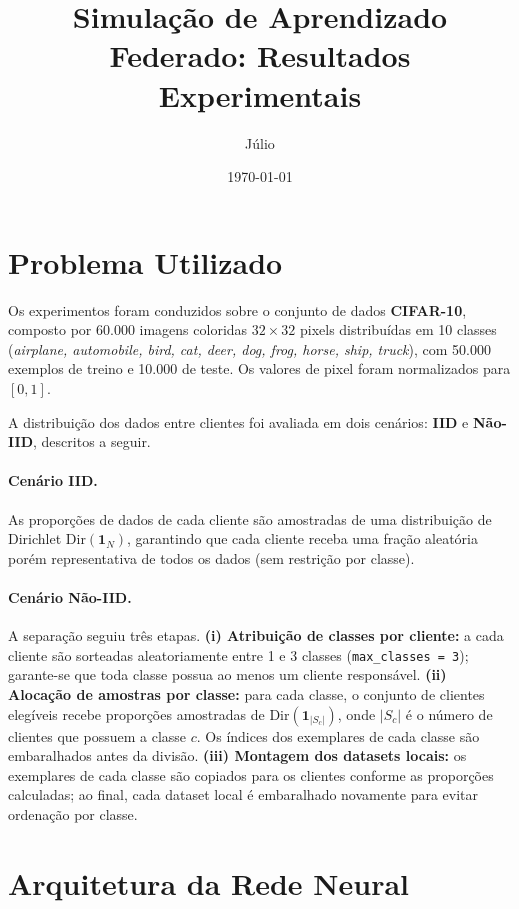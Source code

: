\documentclass[12pt, a4paper]{article}
\title{\large\textbf{Simulação de Aprendizado Federado: Resultados Experimentais}}
\author{Júlio}
\date{\today}
\begin{document}
\maketitle

\section{Problema Utilizado}

Os experimentos foram conduzidos sobre o conjunto de dados \textbf{CIFAR-10},
composto por 60.000 imagens coloridas $32 \times 32$ pixels distribuídas em
10 classes (\textit{airplane, automobile, bird, cat, deer, dog, frog, horse,
ship, truck}), com 50.000 exemplos de treino e 10.000 de teste.
Os valores de pixel foram normalizados para $[0, 1]$.

A distribuição dos dados entre clientes foi avaliada em dois cenários:
\textbf{IID} e \textbf{Não-IID}, descritos a seguir.

\paragraph{Cenário IID.}
As proporções de dados de cada cliente são amostradas de uma distribuição de Dirichlet
$\text{Dir}(\mathbf{1}_N)$, garantindo que cada cliente receba uma fração aleatória
porém representativa de todos os dados (sem restrição por classe).

\paragraph{Cenário Não-IID.}
A separação seguiu três etapas.
\textbf{(i) Atribuição de classes por cliente:} a cada cliente são sorteadas
aleatoriamente entre 1 e 3 classes (\texttt{max\_classes = 3});
garante-se que toda classe possua ao menos um cliente responsável.
\textbf{(ii) Alocação de amostras por classe:} para cada classe, o conjunto de
clientes elegíveis recebe proporções amostradas de $\text{Dir}(\mathbf{1}_{|S_c|})$,
onde $|S_c|$ é o número de clientes que possuem a classe $c$.
Os índices dos exemplares de cada classe são embaralhados antes da divisão.
\textbf{(iii) Montagem dos datasets locais:} os exemplares de cada classe são
copiados para os clientes conforme as proporções calculadas; ao final, cada
dataset local é embaralhado novamente para evitar ordenação por classe.

\section{Arquitetura da Rede Neural}
\end{document}
